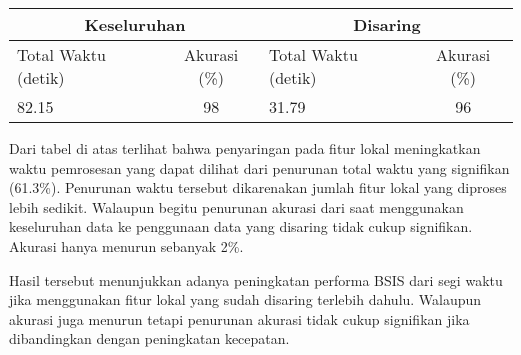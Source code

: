 \begin{table}[H]
	\centering
	\begin{tabular}{|cc|cc|}
		\hline
		\multicolumn{2}{|c|}{\textbf{Keseluruhan}}                        & \multicolumn{2}{c|}{\textbf{Disaring}}                           \\ \hline
		\multicolumn{1}{|l|}{Total Waktu (detik)} & Akurasi (\%) & \multicolumn{1}{l|}{Total Waktu (detik)} & Akurasi (\%) \\ \hline
		\multicolumn{1}{|l|}{82.15}               & 98           & \multicolumn{1}{l|}{31.79}               & 96           \\ \hline
	\end{tabular}
\end{table}

Dari tabel di atas terlihat bahwa penyaringan pada fitur lokal meningkatkan waktu pemrosesan yang dapat dilihat dari penurunan total waktu yang signifikan (61.3\%). Penurunan waktu tersebut dikarenakan jumlah fitur lokal yang diproses lebih sedikit. Walaupun begitu penurunan akurasi dari saat menggunakan keseluruhan data ke penggunaan data yang disaring tidak cukup signifikan. Akurasi hanya menurun sebanyak 2\%. 

Hasil tersebut menunjukkan adanya peningkatan performa BSIS dari segi waktu jika menggunakan fitur lokal yang sudah disaring terlebih dahulu. Walaupun akurasi juga menurun tetapi penurunan akurasi tidak cukup signifikan jika dibandingkan dengan peningkatan kecepatan.

